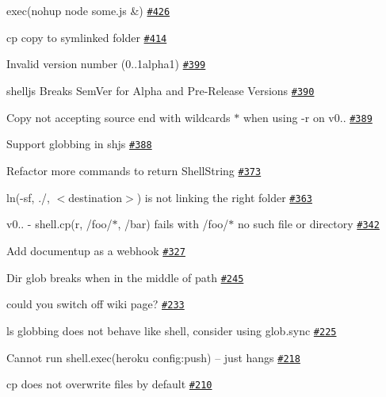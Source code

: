 \begin{DoxyItemize}
\item exec(\textquotesingle{}nohup node some.\+js \&\textquotesingle{}) \href{https://github.com/shelljs/shelljs/issues/426}{\tt \#426}
\item cp copy to symlinked folder \href{https://github.com/shelljs/shelljs/issues/414}{\tt \#414}
\item Invalid version number (0..\+1alpha1) \href{https://github.com/shelljs/shelljs/issues/399}{\tt \#399}
\item shelljs Breaks Sem\+Ver for Alpha and Pre-\/\+Release Versions \href{https://github.com/shelljs/shelljs/issues/390}{\tt \#390}
\item Copy not accepting source end with wildcards $\ast$ when using -\/r on v0.. \href{https://github.com/shelljs/shelljs/issues/389}{\tt \#389}
\item Support globbing in {\ttfamily shjs} \href{https://github.com/shelljs/shelljs/issues/388}{\tt \#388}
\item Refactor more commands to return Shell\+String \href{https://github.com/shelljs/shelljs/issues/373}{\tt \#373}
\item ln(\textquotesingle{}-\/sf\textquotesingle{}, \textquotesingle{}./\textquotesingle{}, \textquotesingle{}$<$destination$>$\textquotesingle{}) is not linking the right folder \href{https://github.com/shelljs/shelljs/issues/363}{\tt \#363}
\item v0.. -\/ shell.\+cp(\textquotesingle{}r\textquotesingle{}, \textquotesingle{}/foo/$\ast$, \textquotesingle{}/bar\textquotesingle{}) fails with /foo/$\ast$ no such file or directory \href{https://github.com/shelljs/shelljs/issues/342}{\tt \#342}
\item Add documentup as a webhook \href{https://github.com/shelljs/shelljs/issues/327}{\tt \#327}
\item Dir glob breaks when in the middle of path \href{https://github.com/shelljs/shelljs/issues/245}{\tt \#245}
\item could you switch off wiki page? \href{https://github.com/shelljs/shelljs/issues/233}{\tt \#233}
\item ls globbing does not behave like shell, consider using glob.\+sync \href{https://github.com/shelljs/shelljs/issues/225}{\tt \#225}
\item Cannot run shell.\+exec(\textquotesingle{}heroku config\+:push\textquotesingle{}) -- just hangs \href{https://github.com/shelljs/shelljs/issues/218}{\tt \#218}
\item {\ttfamily cp} does not overwrite files by default \href{https://github.com/shelljs/shelljs/issues/210}{\tt \#210}

\end{DoxyItemize}
